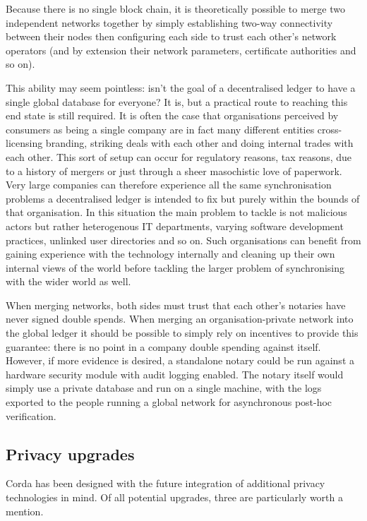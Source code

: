 \documentclass{article}
\begin{document}
Because there is no single block chain, it is theoretically possible to merge two independent networks together by simply
establishing two-way connectivity between their nodes then configuring each side to trust each other's network operators
(and by extension their network parameters, certificate authorities and so on).

This ability may seem pointless: isn't the goal of a decentralised ledger to have a single global database for
everyone? It is, but a practical route to reaching this end state is still required. It is often the case that
organisations perceived by consumers as being a single company are in fact many different entities cross-licensing
branding, striking deals with each other and doing internal trades with each other. This sort of setup can occur
for regulatory reasons, tax reasons, due to a history of mergers or just through a sheer masochistic love of
paperwork. Very large companies can therefore experience all the same synchronisation problems a decentralised
ledger is intended to fix but purely within the bounds of that organisation. In this situation the main problem to
tackle is not malicious actors but rather heterogenous IT departments, varying software development practices,
unlinked user directories and so on. Such organisations can benefit from gaining experience with the technology
internally and cleaning up their own internal views of the world before tackling the larger problem of
synchronising with the wider world as well.

When merging networks, both sides must trust that each other's notaries have never signed double spends. When
merging an organisation-private network into the global ledger it should be possible to simply rely on incentives
to provide this guarantee: there is no point in a company double spending against itself. However, if more evidence
is desired, a standalone notary could be run against a hardware security module with audit logging enabled. The
notary itself would simply use a private database and run on a single machine, with the logs exported to the people
running a global network for asynchronous post-hoc verification.

\subsection{Privacy upgrades}\label{subsec:privacy-upgrades}

Corda has been designed with the future integration of additional privacy technologies in mind. Of all potential
upgrades, three are particularly worth a mention.
\end{document}
